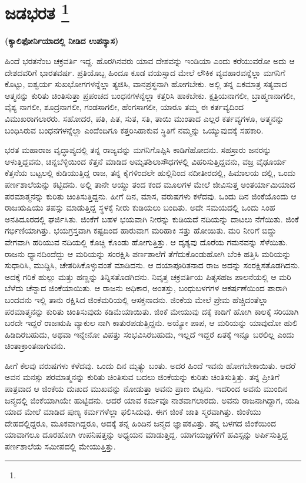 
\chapter[ಜಡಭರತ]{ಜಡಭರತ \protect\footnote{}}

\centerline{\textbf{(ಕ್ಯಾಲಿಫೋರ್ನಿಯಾದಲ್ಲಿ ನೀಡಿದ ಉಪನ್ಯಾಸ)}}

ಹಿಂದೆ ಭರತನೆಂಬ ಚಕ್ರವರ್ತಿ ಇದ್ದ. ಹೊರಗಿನವರು ಯಾವ ದೇಶವನ್ನು ಇಂಡಿಯಾ ಎಂದು ಕರೆಯುವರೋ ಅದು ಆ ದೇಶದವರಿಗೆ ಭಾರತವರ್ಷ. ಪ್ರತಿಯೊಬ್ಬ ಹಿಂದೂ ಕೂಡ ವಯಸ್ಸಾದ ಮೇಲೆ ಲೌಕಿಕ ವ್ಯವಹಾರವನ್ನೆಲ್ಲಾ ಮಗನಿಗೆ ಕೊಟ್ಟು, ಐಶ್ವರ್ಯ ಸುಖಭೋಗಗಳನ್ನೆಲ್ಲಾ ತ್ಯಜಿಸಿ, ವಾನಪ್ರಸ್ಥನಾಗಿ ಹೋಗಬೇಕು. ಅಲ್ಲಿ ತನ್ನ ಏಕಮಾತ್ರ ಸತ್ಯವಾದ ಆತ್ಮನನ್ನು ಕುರಿತು ಚಿಂತಿಸುತ್ತಾ ಪ್ರಪಂಚದ ಬಂಧನಗಳನ್ನೆಲ್ಲಾ ಕತ್ತರಿಸಿ ಹಾಕಬೇಕು. ಕ್ಷತ್ರಿಯನಾಗಲೀ, ಬ್ರಾಹ್ಮಣನಾಗಲೀ, ವೈಶ್ಯ ನಾಗಲೀ, ಶೂದ್ರನಾಗಲೀ, ಗಂಡಸಾಗಲೀ, ಹೆಂಗಸಾಗಲೀ, ಯಾರೂ ತಮ್ಮ ಈ ಕರ್ತವ್ಯದಿಂದ ವಿಮುಖರಾಗಲಾರರು. ಸಹೋದರ, ಪತಿ, ಪಿತ, ಸುತ, ಸತಿ, ತಾಯಿ ಮುಂತಾದ ಎಲ್ಲರ ಕರ್ತವ್ಯಗಳೂ, ಆತ್ಮನನ್ನು ಬಂಧಿಸಿರುವ ಬಂಧನಗಳನ್ನೆಲ್ಲಾ ಎಂದೆಂದಿಗೂ ಕತ್ತರಿಸಿಹಾಕುವ ಸ್ಥಿತಿಗೆ ನಮ್ಮನ್ನು ಒಯ್ಯುವುದಕ್ಕೆ ಸಹಕಾರಿ.

ಭರತ ಮಹಾರಾಜ ವೃದ್ಧಾಪ್ಯದಲ್ಲಿ ತನ್ನ ರಾಜ್ಯವನ್ನು ಮಗನಿಗೊಪ್ಪಿಸಿ ಕಾಡಿಗೆ\break ಹೋದನು. ಸಹಸ್ರಾರು ಜನರನ್ನು ಆಳುತ್ತಿದ್ದವನು, ಚಿನ್ನಬೆಳ್ಳಿಯಿಂದ ಕೆತ್ತನೆ ಮಾಡಿದ ಅಮೃತಶಿಲಾಸೌಧಗಳಲ್ಲಿ ವಿಹರಿಸುತ್ತಿದ್ದವನು, ವಜ್ರ ವೈಢೂರ್ಯ ಕೆತ್ತನೆಯ ಬಟ್ಟಲಲ್ಲಿ ಕುಡಿಯುತ್ತಿದ್ದ ರಾಜ, ತನ್ನ ಕೈಗಳಿಂದಲೇ ಹುಲ್ಲಿನಿಂದ ನದೀತೀರದಲ್ಲಿ, ಹಿಮಾಲಯ ದಲ್ಲಿ, ಒಂದು ಪರ್ಣಶಾಲೆಯನ್ನು ಕಟ್ಟಿದನು. ಅಲ್ಲಿ ತಾನೇ ಆಯ್ದು ತಂದ ಕಂದ ಮೂಲಗಳ ಮೇಲೆ ಜೀವಿಸುತ್ತ ಅಂತರ್ಯಾಮಿಯಾದ ಪರಮಾತ್ಮನನ್ನು ಕುರಿತು ಚಿಂತಿಸುತ್ತಿದ್ದನು. ಹೀಗೆ ದಿನ, ಮಾಸ, ವರುಷಗಳು ಕಳೆದವು. ಒಂದು ದಿನ ಜಿಂಕೆಯೊಂದು ಆ ರಾಜಋಷಿಯು ತಪಸ್ಸು ಮಾಡುತ್ತಿದ್ದ ಸ್ಥಳಕ್ಕೆ ನೀರು ಕುಡಿಯಲು ಬಂದಿತು. ಅದೇ ಸಮಯದಲ್ಲಿ ಒಂದು ಸಿಂಹ ಅನತಿದೂರದಲ್ಲಿ ಘರ್ಜಿಸಿತು. ಜಿಂಕೆಗೆ ಬಹಳ ಭಯವಾಗಿ ನೀರನ್ನು ಕುಡಿಯದೆ ನದಿಯನ್ನು ದಾಟಲು ನೆಗೆಯಿತು. ಜಿಂಕೆ ಗರ್ಭಿಣಿಯಾಗಿತ್ತು. ಭಯಗ್ರಸ್ತವಾಗಿ ಕಷ್ಟದಿಂದ ಹಾರುವಾಗ ಮರಿಹಾಕಿ ಸತ್ತು ಹೋಯಿತು. ಮರಿ ನೀರಿಗೆ ಬಿದ್ದು ವೇಗವಾಗಿ ಹರಿಯುವ ನದಿಯಲ್ಲಿ ಕೊಚ್ಚಿ ಕೊಂಡು ಹೋಗುತ್ತಿತ್ತು. ಆ ದೃಶ್ಯವು ದೊರೆಯ ಗಮನವನ್ನು ಸೆಳೆಯಿತು. ರಾಜನು ಧ್ಯಾನದಿಂದೆದ್ದು ಆ ಮರಿಯನ್ನು ಸಂರಕ್ಷಿಸಿ ಪರ್ಣಶಾಲೆಗೆ ತೆಗೆದುಕೊಂಡುಹೋಗಿ ಬೆಂಕಿ ಹತ್ತಿಸಿ ಮರಿಯನ್ನು ಸುಧಾರಿಸಿ, ಮುದ್ದಿಸಿ, ಚೇತರಿಸಿಕೊಳ್ಳುವಂತೆ ಮಾಡಿದನು. ಆ ದಯಾಪೂರಿತನಾದ ರಾಜ ಅದನ್ನು ಸಂರಕ್ಷಿಸತೊಡಗಿದನು. ಅದಕ್ಕೆ ಗರಿಕೆ ಹುಲ್ಲು ಮತ್ತು ಹಣ್ಣನ್ನು ತಿನ್ನಿಸತೊಡಗಿದನು. ನಿವೃತ್ತ ಚಕ್ರವರ್ತಿಯ ಪಿತೃಸಹಜ ಪಾಲನೆಯಲ್ಲಿ ಆ ಮರಿ ಬೆಳೆದು ಚೆನ್ನಾದ ಜಿಂಕೆಯಾಯಿತು. ಆ ರಾಜನು ಅಧಿಕಾರ, ಅಂತಸ್ತು, ಬಂಧುಬಳಗಗಳ ಆಕರ್ಷಣೆಯಿಂದ ಪಾರಾಗಿ ಬಂದವನು ಇಲ್ಲಿ ತಾನು ರಕ್ಷಿಸಿದ ಜಿಂಕೆಮರಿಯಲ್ಲಿ ಆಸಕ್ತನಾದನು. ಜಿಂಕೆಯ ಮೇಲೆ ಪ್ರೇಮ ಹೆಚ್ಚಿದಂತೆಲ್ಲಾ ಪರಮಾತ್ಮನನ್ನು ಕುರಿತು ಚಿಂತಿಸುವುದು ಕಡಿಮೆಯಾಯಿತು. ಜಿಂಕೆ ಮೇಯುವು ದಕ್ಕೆ ಕಾಡಿಗೆ ಹೋಗಿ ಕಾಲಕ್ಕೆ ಸರಿಯಾಗಿ ಬರದೇ ಇದ್ದರೆ ರಾಜಋಷಿ ವ್ಯಾಕುಲ ನಾಗಿ ಕಾತುರಪಡುತ್ತಿದ್ದನು. ಅಯ್ಯೋ ಪಾಪ, ಆ ಮರಿಯನ್ನು ಯಾವುದೋ ಹುಲಿ ಹಿಡಿದಿರಬಹುದು, ಅಥವಾ ಇನ್ನೇನೋ ವಿಪತ್ತು ಸಂಭವಿಸಿರಬಹುದು, ಇಲ್ಲದೆ ಇದ್ದರೆ ಏತಕ್ಕೆ ಇನ್ನೂ ಬರಲಿಲ್ಲ ಎಂದು ಚಿಂತಾಕ್ರಾಂತನಾಗುವನು.

ಹೀಗೆ ಕೆಲವು ವರುಷಗಳು ಕಳೆದವು. ಒಂದು ದಿನ ಮೃತ್ಯು ಬಂತು. ಅದರ ಹಿಂದೆ ಇವನು ಹೋಗಬೇಕಾಯಿತು. ಆದರೆ ಅವನ ಮನಸ್ಸು ಪರಮಾತ್ಮನನ್ನು ಕುರಿತು ಚಿಂತಿಸುವ ಬದಲು ಜಿಂಕೆಯನ್ನು ಕುರಿತು ಚಿಂತಿಸುತ್ತಿತ್ತು. ತನ್ನ ಪ್ರೀತಿಗೆ ಪಾತ್ರವಾದ ಆ ಜಿಂಕೆಯ ದುಃಖದ ಮುಖವನ್ನು ನೋಡುತ್ತಾ ಅವನು ಪ್ರಾಣ ಬಿಟ್ಟನು. ಇದರಿಂದ ಅವನು ಮುಂದಿನ ಜನ್ಮದಲ್ಲಿ ಜಿಂಕೆಯಾಗಿಯೇ ಹುಟ್ಟಿದನು. ಆದರೆ ಯಾವ ಕರ್ಮವೂ ನಾಶವಾಗಲಾರದು. ಅವನು ರಾಜನಾಗಿದ್ದಾಗ, ಋಷಿ ಯಾದ ಮೇಲೆ ಮಾಡಿದ ಪುಣ್ಯ ಕರ್ಮಗಳೆಲ್ಲಾ ಫಲಿಸಿದುವು. ಈಗ ಜಿಂಕೆ ಜಾತಿ ಸ್ಮರವಾಗಿತ್ತು. ಜಿಂಕೆಯು ದೇಹದಲ್ಲಿದ್ದರೂ, ಮೂಕವಾಗಿದ್ದರೂ, ಅದಕ್ಕೆ ತನ್ನ ಹಿಂದಿನ ಜನ್ಮದ ಜ್ಞಾಪಕವಿತ್ತು. ತನ್ನ ಬಳಗದ ಜಿಂಕೆಯಿಂದ ಯಾವಾಗಲೂ ದೂರಹೋಗಿ ಉಪನಿಷತ್ತನ್ನು ಅಧ್ಯಯನ ಮಾಡುತ್ತಿದ್ದ. ಯಾಗಯಜ್ಞಗಳಿಗೆ ಹವಿಸ್ಸನ್ನು ಅರ್ಪಿಸುತ್ತಿದ್ದ ಪರ್ಣಶಾಲೆಯ ಸಮೀಪದಲ್ಲಿ ಮೇಯುತ್ತಿತ್ತು.


